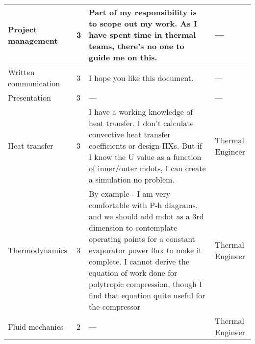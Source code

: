 \documentclass[11pt, oneside]{article}   	%
\begin{document}
\begin{center}
\begin{tabularx}{\textwidth}{X l X X}
\hline
	Project management & 
	3 & 
	Part of my responsibility is to scope out my work. As I have spent time in thermal teams, there's no one to guide me on this. & 
	--- \\
\hline
	Written communication & 
	3 & 
	I hope you like this document. & 
	--- \\
\hline
	Presentation & 
	3 & 
	--- & 
	--- \\
\hline
	Heat transfer & 
	3 & 
	I have a working knowledge of heat transfer. I don't calculate convective heat transfer coefficients or design HXs. But if I know the U value as a function of inner/outer mdots, I can create a simulation no problem. 		& 
	Thermal Engineer \\
\hline
	Thermodynamics & 
	3 & 
	By example - I am very comfortable with P-h diagrams, and we should add mdot as a 3rd dimension to 		contemplate operating points for a constant evaporator power flux to make it complete. I cannot derive the 	equation of work done for polytropic compression, though I find that equation quite useful for the 			compressor & 
	Thermal Engineer \\
\hline
Fluid mechanics & 2 & --- & Thermal Engineer \\
\hline

\end{tabularx}
\end{center}
\end{document}
